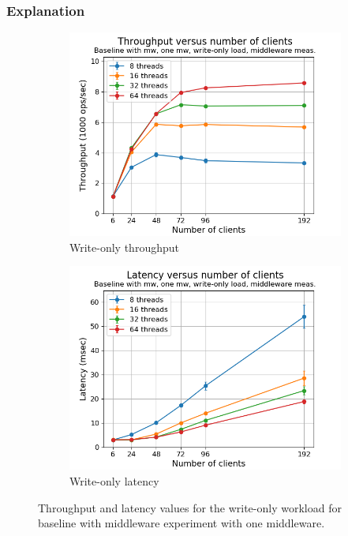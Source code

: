 \documentclass[11pt,a4paper]{article}
\begin{document}
\subsubsection{Explanation} \label{sec:mwb1-exp}
\begin{figure}[h]
\centering
\begin{subfigure}{.5\textwidth}
  \centering
  \includegraphics[width=1.0\linewidth,trim={5px 0px 20px 0px},clip]{img/plot/mwb1-wo-tp_mw.png}
  \caption{Write-only throughput}
  \label{fig:mwb1-wo-tp_mw}
\end{subfigure}%
\begin{subfigure}{.5\textwidth}
  \centering
  \includegraphics[width=1.0\linewidth,trim={5px 0px 20px 0px},clip]{img/plot/mwb1-wo-lat_mw.png}
  \caption{Write-only latency}
  \label{fig:mwb1-wo-lat_mw}
\end{subfigure}
\caption{Throughput and latency values for the write-only workload for baseline with middleware experiment with one middleware.}
\label{fig:mwb1-wo_mw}
\end{figure}
\end{document}
